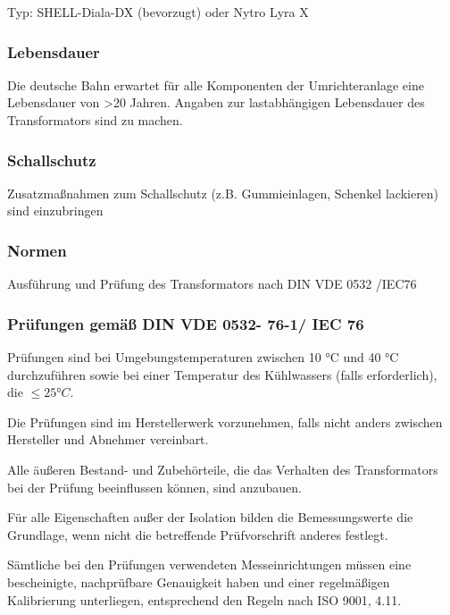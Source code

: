Typ:	 SHELL-Diala-DX (bevorzugt) oder Nytro Lyra X 

\subsubsection*{Lebensdauer}
Die deutsche Bahn erwartet für alle Komponenten der Umrichteranlage eine Lebensdauer von >20 Jahren. Angaben zur lastabhängigen Lebensdauer des Transformators sind zu machen. 

\subsubsection*{Schallschutz}
Zusatzmaßnahmen zum Schallschutz (z.B. Gummieinlagen, Schenkel lackieren) sind einzubringen

\subsubsection*{Normen}
Ausführung und Prüfung des Transformators nach DIN VDE 0532 /IEC76 
\subsubsection*{Prüfungen gemäß DIN VDE 0532- 76-1/ IEC 76}
Prüfungen sind bei Umgebungstemperaturen zwischen 10 °C und 40 °C durchzuführen sowie bei einer
Temperatur des Kühlwassers (falls erforderlich), die $\leq \ang{25}C $.

Die Prüfungen sind im Herstellerwerk vorzunehmen, falls nicht anders zwischen Hersteller und Abnehmer
vereinbart.

Alle äußeren Bestand- und Zubehörteile, die das Verhalten des Transformators bei der Prüfung beeinflussen
können, sind anzubauen.

Für alle Eigenschaften außer der Isolation bilden die Bemessungswerte die Grundlage, wenn nicht die
betreffende Prüfvorschrift anderes festlegt.

Sämtliche bei den Prüfungen verwendeten Messeinrichtungen müssen eine bescheinigte, nachprüfbare
Genauigkeit haben und einer regelmäßigen Kalibrierung unterliegen, entsprechend den Regeln nach
ISO 9001, 4.11.\cite*{DINEN600761.}

